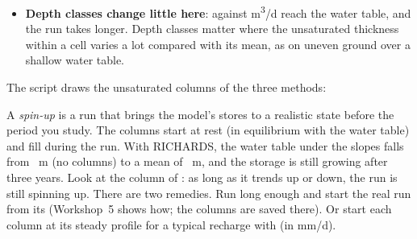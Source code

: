 \begin{itemize}
  carry the recharge. Over the three years it holds back \% of what enters the columns. So only
  ~m\textsuperscript{3}/d reach the water table, against  with KINEMATIC,
  and the water table under the slopes lies on average ~m deeper than without columns. Most of this is spin-up (see the
  note below). The recharge also arrives later and smoother (Figure~\ref{fig:t3vz}). The flow out of the columns follows
  the flow into them best ~days later with RICHARDS,  days with KINEMATIC and
   days with LAG.
\item \textbf{Depth classes change little here}:  against 
  m\textsuperscript{3}/d reach the water table, and the run takes longer. Depth classes matter where the unsaturated
  thickness within a cell varies a lot compared with its mean, as on uneven ground over a shallow water table.
\end{itemize}
The script  draws the unsaturated columns of the three methods:
\begin{note}
A \emph{spin-up} is a run that brings the model's stores to a realistic state before the period you study. The columns
start at rest (in equilibrium with the water table) and fill during the run. With RICHARDS, the water table under the
slopes falls from ~m (no columns) to a mean of ~m, and the storage is still growing
after three years. Look at the column  of : as long as it trends up or
down, the run is still spinning up. There are two remedies. Run long enough and start the real run from its
 (Workshop~5 shows how; the columns are saved there). Or start each column at its steady profile for a
typical recharge with  (in mm/d).
\end{note}
